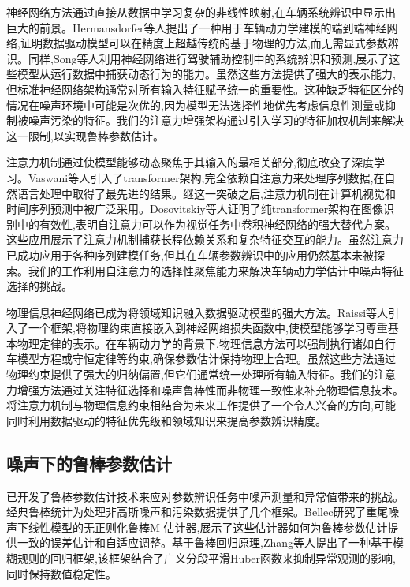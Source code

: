 \documentclass[Afour,sageh,times]{sagej}
\begin{document}
神经网络方法通过直接从数据中学习复杂的非线性映射,在车辆系统辨识中显示出巨大的前景。Hermansdorfer等人\citep{Hermansdorfer2020EndtoEnd}提出了一种用于车辆动力学建模的端到端神经网络,证明数据驱动模型可以在精度上超越传统的基于物理的方法,而无需显式参数辨识。同样,Song等人\citep{Song2025DataDriven}利用神经网络进行驾驶辅助控制中的系统辨识和预测,展示了这些模型从运行数据中捕获动态行为的能力。虽然这些方法提供了强大的表示能力,但标准神经网络架构通常对所有输入特征赋予统一的重要性。这种缺乏特征区分的情况在噪声环境中可能是次优的,因为模型无法选择性地优先考虑信息性测量或抑制被噪声污染的特征。我们的注意力增强架构通过引入学习的特征加权机制来解决这一限制,以实现鲁棒参数估计。

注意力机制通过使模型能够动态聚焦于其输入的最相关部分,彻底改变了深度学习。Vaswani等人\citep{Vaswani2017AttentionIA}引入了transformer架构,完全依赖自注意力来处理序列数据,在自然语言处理中取得了最先进的结果。继这一突破之后,注意力机制在计算机视觉和时间序列预测中被广泛采用。Dosovitskiy等人\citep{Dosovitskiy2020AnII}证明了纯transformer架构在图像识别中的有效性,表明自注意力可以作为视觉任务中卷积神经网络的强大替代方案。这些应用展示了注意力机制捕获长程依赖关系和复杂特征交互的能力。虽然注意力已成功应用于各种序列建模任务,但其在车辆参数辨识中的应用仍然基本未被探索。我们的工作利用自注意力的选择性聚焦能力来解决车辆动力学估计中噪声特征选择的挑战。

物理信息神经网络已成为将领域知识融入数据驱动模型的强大方法。Raissi等人\citep{Raissi2019PhysicsinformedNN}引入了一个框架,将物理约束直接嵌入到神经网络损失函数中,使模型能够学习尊重基本物理定律的表示。在车辆动力学的背景下,物理信息方法可以强制执行诸如自行车模型方程或守恒定律等约束,确保参数估计保持物理上合理。虽然这些方法通过物理约束提供了强大的归纳偏置,但它们通常统一处理所有输入特征。我们的注意力增强方法通过关注特征选择和噪声鲁棒性而非物理一致性来补充物理信息技术。将注意力机制与物理信息约束相结合为未来工作提供了一个令人兴奋的方向,可能同时利用数据驱动的特征优先级和领域知识来提高参数辨识精度。

\subsection{噪声下的鲁棒参数估计}
\label{sec:robust_estimation}

已开发了鲁棒参数估计技术来应对参数辨识任务中噪声测量和异常值带来的挑战。经典鲁棒统计为处理非高斯噪声和污染数据提供了几个框架。Bellec\citep{Bellec2023ErrorEA}研究了重尾噪声下线性模型的无正则化鲁棒M-估计器,展示了这些估计器如何为鲁棒参数估计提供一致的误差估计和自适应调整。基于鲁棒回归原理,Zhang等人\citep{Zhang2025ARF}提出了一种基于模糊规则的回归框架,该框架结合了广义分段平滑Huber函数来抑制异常观测的影响,同时保持数值稳定性。
\end{document}
